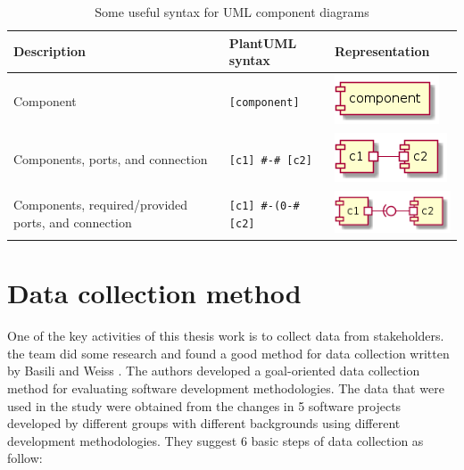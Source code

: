 \begin{table}[H]
\centering
\begin{tabular}{>{\centering}m{1.8in} >{\centering}m{2in} >{\centering\arraybackslash}m{1.5in}}
\toprule
\textbf{Description} & \textbf{PlantUML syntax} & \textbf{Representation} \\
\midrule
Component & \texttt{[component]} & \includegraphics[width=0.6\linewidth]{figure/plantuml_example/component.png} \\ \hline
Components, ports, and connection &  \texttt{[c1] \#-\# [c2]} & \includegraphics[width=0.7\linewidth]{figure/plantuml_example/port.png}\\ \hline
Components, required/provided ports, and connection & \texttt{[c1] \#-(0-\# [c2]} & \includegraphics[width=0.8\linewidth]{figure/plantuml_example/port_type.png}\\
\bottomrule
\end{tabular}
\caption{Some useful syntax for UML component diagrams}
\label{table:plantuml_component_syntax}
\end{table}


\section{Data collection method}
One of the key activities of this thesis work is to collect data from stakeholders. the team did some research and found a good method for data collection written by Basili and Weiss \cite{Basili}. The authors developed a goal-oriented data collection method for evaluating software development methodologies. The data that were used in the study were obtained from the changes in 5 software projects developed by different groups with different backgrounds using different development methodologies. They suggest 6 basic steps of data collection as follow:\\[0.1cm]

